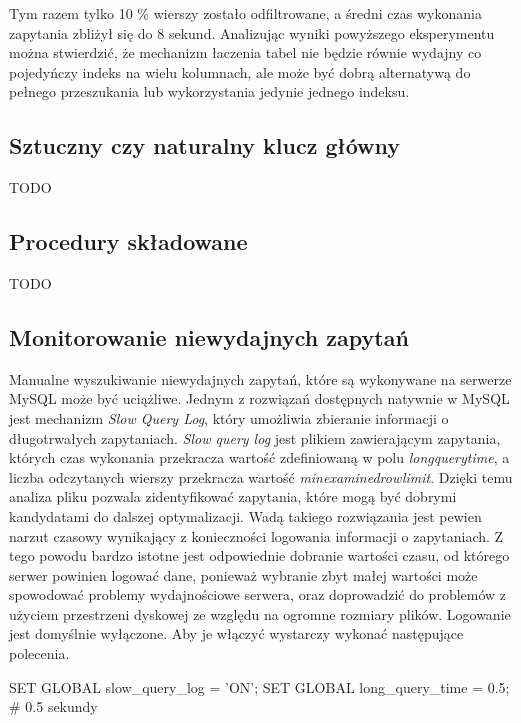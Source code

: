 Tym razem tylko 10 \% wierszy zostało odfiltrowane, a średni czas wykonania zapytania zbliżył się do 8 sekund. Analizując wyniki powyższego eksperymentu można stwierdzić, że mechanizm łaczenia tabel nie będzie równie wydajny co pojedyńczy indeks na wielu kolumnach, ale może być dobrą alternatywą do pełnego przeszukania lub wykorzystania jedynie jednego indeksu.
\subsection{Sztuczny czy naturalny klucz główny}
TODO

\subsection{Procedury składowane}
TODO

\subsection{Monitorowanie niewydajnych zapytań}
Manualne wyszukiwanie niewydajnych zapytań, które są wykonywane na serwerze MySQL może być uciążliwe. Jednym z rozwiązań dostępnych natywnie w MySQL jest mechanizm \textit{Slow Query Log}, który umożliwia zbieranie informacji o długotrwałych zapytaniach. \textit{Slow query log} jest plikiem zawierającym zapytania, których czas wykonania przekracza wartość zdefiniowaną w polu \textit{long\textunderscore query\textunderscore time}, a liczba odczytanych wierszy przekracza wartość \textit{min\textunderscore examined\textunderscore row\textunderscore limit}. Dzięki temu analiza pliku pozwala zidentyfikować zapytania, które mogą być dobrymi kandydatami do dalszej optymalizacji. Wadą takiego rozwiązania jest pewien narzut czasowy wynikający z konieczności logowania informacji o zapytaniach. Z tego powodu bardzo istotne jest odpowiednie dobranie wartości czasu, od którego serwer powinien logować dane, ponieważ wybranie zbyt małej wartości może spowodować problemy wydajnościowe serwera, oraz doprowadzić do problemów z użyciem przestrzeni dyskowej ze względu na ogromne rozmiary plików. Logowanie jest domyślnie wyłączone. Aby je włączyć wystarczy wykonać następujące polecenia.
\begin{spverbatim}
	SET GLOBAL slow_query_log = 'ON';
	SET GLOBAL long_query_time = 0.5; # 0.5 sekundy
\end{spverbatim}
